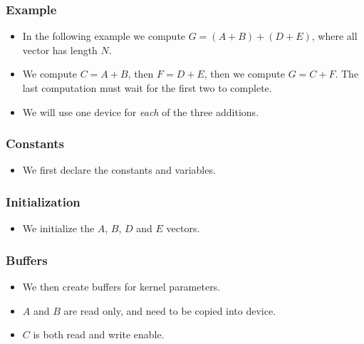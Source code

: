 \documentclass{beamer}
\begin{document}
\begin{frame}
  \frametitle{Example}
  \begin{itemize}
  \item In the following example we compute $G = (A + B) + (D + E)$,
    where all vector has length $N$.
  \item We compute $C = A + B$, then $F = D + E$, then we compute $G =
    C + F$.  The last computation must wait for the first two to
    complete.
    \item We will use one device for {\em each} of the three additions.
  \end{itemize}
\end{frame}

\begin{frame}
  \frametitle{Constants}
  \begin{itemize}
    \item We first declare the constants and variables.
  \end{itemize}
\end{frame}

\begin{frame}
\end{frame}

\begin{frame}
  \frametitle{Initialization}
  \begin{itemize}
    \item We initialize the $A$, $B$, $D$ and $E$ vectors.
  \end{itemize}
\end{frame}


\begin{frame}
\end{frame}

\begin{frame}
  \frametitle{Buffers}
  \begin{itemize}
    \item We then create buffers for kernel parameters.
    \item $A$ and $B$ are read only, and need to be copied into device.
    \item $C$ is both read and write enable.
  \end{itemize}
\end{frame}

\begin{frame}
\end{frame}
\end{document}
